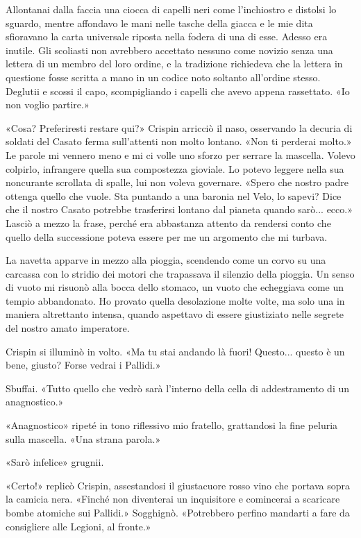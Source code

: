 Allontanai dalla faccia una ciocca di capelli neri come l'inchiostro e
distolsi lo sguardo, mentre affondavo le mani nelle tasche della giacca
e le mie dita sfioravano la carta universale riposta nella fodera di una
di esse. Adesso era inutile. Gli scoliasti non avrebbero accettato
nessuno come novizio senza una lettera di un membro del loro ordine, e
la tradizione richiedeva che la lettera in questione fosse scritta a
mano in un codice noto soltanto all'ordine stesso. Deglutii e scossi il
capo, scompigliando i capelli che avevo appena rassettato. «Io non
voglio partire.»

«Cosa? Preferiresti restare qui?» Crispin arricciò il naso, osservando
la decuria di soldati del Casato ferma sull'attenti non molto lontano.
«Non ti perderai molto.» Le parole mi vennero meno e mi ci volle uno
sforzo per serrare la mascella. Volevo colpirlo, infrangere quella sua
compostezza gioviale. Lo potevo leggere nella sua noncurante scrollata
di spalle, lui non voleva governare. «Spero che nostro padre ottenga
quello che vuole. Sta puntando a una baronia nel Velo, lo sapevi? Dice
che il nostro Casato potrebbe trasferirsi lontano dal pianeta quando
sarò... ecco.» Lasciò a mezzo la frase, perché era abbastanza attento da
rendersi conto che quello della successione poteva essere per me un
argomento che mi turbava.

La navetta apparve in mezzo alla pioggia, scendendo come un corvo su una
carcassa con lo stridio dei motori che trapassava il silenzio della
pioggia. Un senso di vuoto mi risuonò alla bocca dello stomaco, un vuoto
che echeggiava come un tempio abbandonato. Ho provato quella desolazione
molte volte, ma solo una in maniera altrettanto intensa, quando
aspettavo di essere giustiziato nelle segrete del nostro amato
imperatore.

Crispin si illuminò in volto. «Ma tu stai andando là fuori! Questo...
questo è un bene, giusto? Forse vedrai i Pallidi.»

Sbuffai. «Tutto quello che vedrò sarà l'interno della cella di
addestramento di un anagnostico.»

«Anagnostico» ripeté in tono riflessivo mio fratello, grattandosi la
fine peluria sulla mascella. «Una strana parola.»

«Sarò infelice» grugnii.

«Certo!» replicò Crispin, assestandosi il giustacuore rosso vino che
portava sopra la camicia nera. «Finché non diventerai un inquisitore e
comincerai a scaricare bombe atomiche sui Pallidi.» Sogghignò.
«Potrebbero perfino mandarti a fare da consigliere alle Legioni, al
fronte.»

